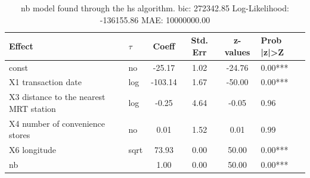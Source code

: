 \begin{table}
	\caption{nb model found through the hs algorithm. bic: 272342.85 Log-Likelihood: -136155.86 MAE: 10000000.00}
	\begin{center}
		\begin{tabular}{|l|l|c|c|c|l|}
			\hline
			Effect & $\tau$ & Coeff & Std. Err & z-values & Prob |z|>Z \\
			\hline
			const & no & -25.17 & 1.02 & -24.76 & 0.00*** \\
			\hline
			X1 transaction date & log & -103.14 & 1.67 & -50.00 & 0.00*** \\
			\hline
			X3 distance to the nearest MRT station & log & -0.25 & 4.64 & -0.05 & 0.96 \\
			\hline
			X4 number of convenience stores & no & 0.01 & 1.52 & 0.01 & 0.99 \\
			\hline
			X6 longitude & sqrt & 73.93 & 0.00 & 50.00 & 0.00*** \\
			\hline
			nb &  & 1.00 & 0.00 & 50.00 & 0.00*** \\
			\hline
		\end{tabular}
	\end{center}
\end{table}